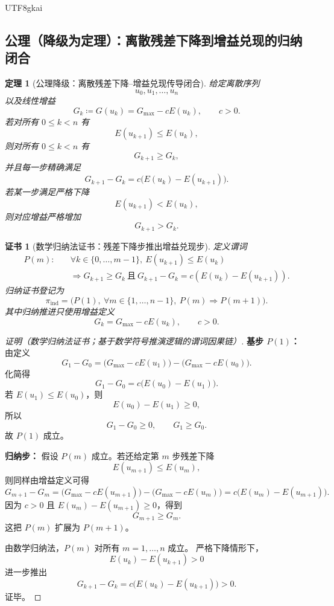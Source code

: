 \documentclass[12pt]{article}
\newtheorem{theorem}{定理}[section]
\newtheorem{Certificate}{证书}[section]
\newcommand{\DefEq}{\coloneqq}
\begin{document}
\begin{CJK*}{UTF8}{gkai}
\subsection{公理（降级为定理）：离散残差下降到增益兑现的归纳闭合}
\label{subsec:tex58-axiom-demoted-induction}

\begin{theorem}[公理降级：离散残差下降--增益兑现传导闭合]
\label{thm:tex58-discrete-gain-induction}
给定离散序列
\[
  u_0,u_1,\ldots,u_n
\]
以及线性增益
\[
  G_k\DefEq G(u_k)=G_{\max}-cE(u_k),
  \qquad c>0.
\]
若对所有 \(0\le k<n\) 有
\[
  E(u_{k+1})\le E(u_k),
\]
则对所有 \(0\le k<n\) 有
\[
  G_{k+1}\ge G_k,
\]
并且每一步精确满足
\[
  G_{k+1}-G_k
  =
  c\bigl(E(u_k)-E(u_{k+1})\bigr).
\]
若某一步满足严格下降
\[
  E(u_{k+1})<E(u_k),
\]
则对应增益严格增加
\[
  G_{k+1}>G_k.
\]
\end{theorem}

\begin{Certificate}[数学归纳法证书：残差下降步推出增益兑现步]
\label{cert:tex58-discrete-gain-induction}
定义谓词
\[
\begin{aligned}
  P(m):\quad
  &\forall k\in\{0,\ldots,m-1\},\
  E(u_{k+1})\le E(u_k)\\
  &\Rightarrow
  G_{k+1}\ge G_k
  \ \text{且}\
  G_{k+1}-G_k=c(E(u_k)-E(u_{k+1})).
\end{aligned}
\]
归纳证书登记为
\[
  \pi_{\mathrm{ind}}
  =
  \bigl(P(1),\ \forall m\in\{1,\ldots,n-1\},\ P(m)\Rightarrow P(m+1)\bigr).
\]
其中归纳推进只使用增益定义
\[
  G_k=G_{\max}-cE(u_k),
  \qquad c>0.
\]
\end{Certificate}

\begin{proof}[证明（数学归纳法证书；基于数学符号推演逻辑的谓词因果链）]
\textbf{基步 \(P(1)\)：}
由定义
\[
  G_1-G_0
  =
  \bigl(G_{\max}-cE(u_1)\bigr)
  -
  \bigl(G_{\max}-cE(u_0)\bigr).
\]
化简得
\[
  G_1-G_0
  =
  c\bigl(E(u_0)-E(u_1)\bigr).
\]
若 \(E(u_1)\le E(u_0)\)，则
\[
  E(u_0)-E(u_1)\ge0,
\]
所以
\[
  G_1-G_0\ge0,
  \qquad
  G_1\ge G_0.
\]
故 \(P(1)\) 成立。

\textbf{归纳步：}
假设 \(P(m)\) 成立。若还给定第 \(m\) 步残差下降
\[
  E(u_{m+1})\le E(u_m),
\]
则同样由增益定义可得
\[
  G_{m+1}-G_m
  =
  \bigl(G_{\max}-cE(u_{m+1})\bigr)
  -
  \bigl(G_{\max}-cE(u_m)\bigr)
  =
  c\bigl(E(u_m)-E(u_{m+1})\bigr).
\]
因为 \(c>0\) 且 \(E(u_m)-E(u_{m+1})\ge0\)，得到
\[
  G_{m+1}\ge G_m.
\]
这把 \(P(m)\) 扩展为 \(P(m+1)\)。

由数学归纳法，\(P(m)\) 对所有 \(m=1,\ldots,n\) 成立。
严格下降情形下，
\[
  E(u_k)-E(u_{k+1})>0
\]
进一步推出
\[
  G_{k+1}-G_k
  =
  c\bigl(E(u_k)-E(u_{k+1})\bigr)>0.
\]
证毕。
\end{proof}


\end{CJK*}
\end{document}
